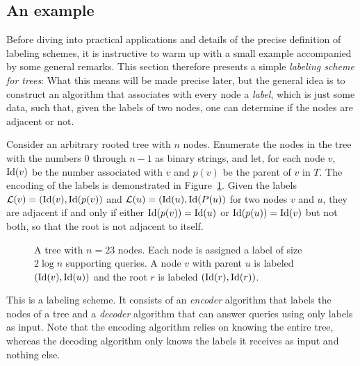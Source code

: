 \subsection{An example} \label{sec:example}
Before diving into practical applications and details of the precise definition of labeling schemes, it is instructive to warm up with a small example accompanied by some general remarks. 
This section therefore presents a simple \emph{\adjacency labeling scheme for trees}: What this means will be made precise later, but the general idea is to construct an algorithm that associates with every node a \emph{label}, which is just some data, such that, given the labels of two nodes, one can determine if the nodes are adjacent or not.

Consider an arbitrary rooted tree with $n$ nodes. Enumerate the nodes in the tree with the numbers $0$ through $n-1$ as binary strings, and let, for each node $v$, $\operatorname{Id}(v)$ be the number associated with $v$ and $p(v)$ be the parent of $v$ in $T$.  The encoding of the labels is demonstrated in Figure~\ref{fig:simple}.
Given the labels $ \mathcal{L}(v)= (\operatorname{Id}(v),\operatorname{Id}(p(v))$ and $ \mathcal{L}(u) = (\operatorname{Id}(u),\operatorname{Id}(P(u))$ for two nodes $v$ and $u$, they are adjacent if and only if either $\operatorname{Id}(p(v))=\operatorname{Id}(u)$ or $\operatorname{Id}(p(u))=\operatorname{Id}(v)$ but not both, so that the root is not adjacent to itself. 

\begin{figure}[!ht]
\centering
{}
\caption{
A tree with $n=23$ nodes. Each node is assigned a label of size $2 \log n$ supporting \adjacency queries. A node $v$ with parent $u$ is labeled $(\operatorname{Id}(v),\operatorname{Id}(u))$ and the root $r$ is labeled $(\operatorname{Id}(r),\operatorname{Id}(r))$.} \label{fig:simple}
\end{figure}

This is a labeling scheme. It consists of an \emph{encoder} algorithm that labels the nodes of a tree and a \emph{decoder} algorithm that can answer \adjacency queries using only labels as input. Note that the encoding algorithm relies on knowing the entire tree, whereas the decoding algorithm only knows the labels it receives as input and nothing else. 

